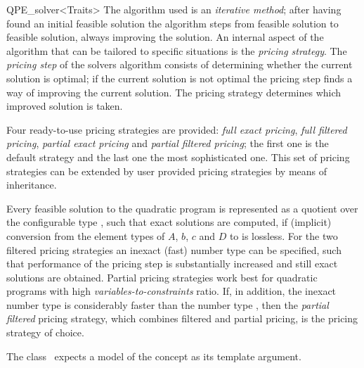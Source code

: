 \begin{ccRefClass}{QPE_solver<Traits>}
The algorithm used is an \emph{iterative method}; after having found an initial
feasible solution the algorithm steps from feasible solution to feasible
solution, always improving the solution.
An internal aspect of the algorithm that can be tailored to specific situations
is the \emph{pricing strategy}.
The \emph{pricing step} of the solvers algorithm consists of determining 
whether the current solution is optimal; if the current solution is not optimal
the pricing step finds a way of improving the current solution. The pricing
strategy determines which improved solution is taken.


Four ready-to-use pricing strategies are provided: \emph{full exact pricing},
\emph{full filtered pricing}, \emph{partial exact pricing} and
\emph{partial filtered pricing};
the first one is the default strategy and the last one the most sophisticated
one.
This set of pricing strategies can be extended by user provided pricing
strategies by means of inheritance.

Every feasible solution to the quadratic program  is represented as a
quotient over the configurable type , such that exact
solutions are computed, if (implicit)
conversion from the element types of $A$, $b$, $c$ and $D$ to 
is lossless. For the two filtered pricing strategies an inexact (fast) number
type  can be specified, such that performance of the pricing step is
substantially increased and still exact solutions are obtained.
Partial pricing strategies work best
for quadratic programs with high \emph{variables-to-constraints} ratio.
If, in addition, the inexact number type  is considerably faster
than the number type , then the \emph{partial filtered} pricing
strategy, which combines filtered and partial pricing,
is the pricing strategy of choice.  
   



\ccRequirements
\ccIndexRequirements

The class \ccRefName\ expects a model of the concept
 as its template argument.

\ccTypes \ccIndexClassTypes






\end{ccRefClass}

